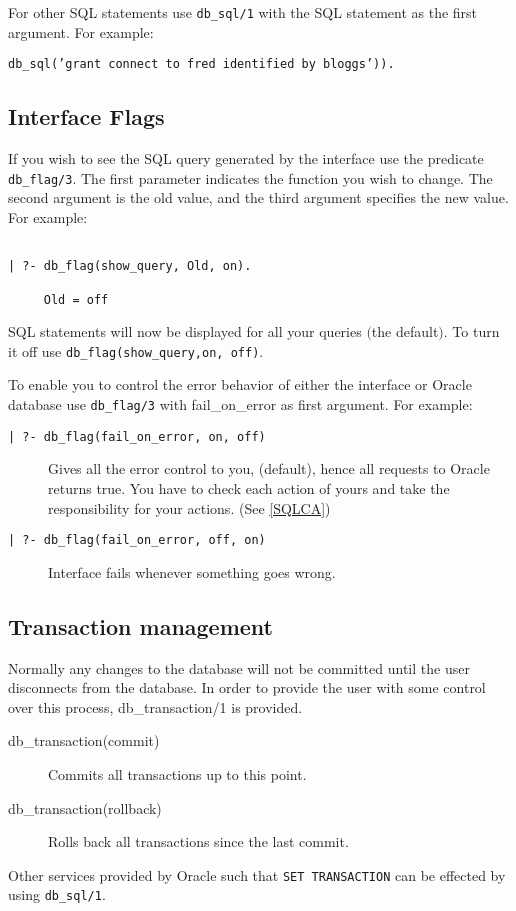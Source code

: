 For other SQL statements use {\tt db\_sql/1} with the SQL statement as the 
     first argument.  For example:
\begin{center}
{\tt db\_sql('grant connect to fred identified by bloggs')).}
\end{center}


\subsection{Interface Flags}
	
   If you wish to see the SQL query generated by the interface use the 
predicate {\tt db\_flag/3}.  The first parameter indicates the function you wish to
change.  The second argument is the old value, and the third argument specifies
the new value.  For example:
\begin{verbatim}

| ?- db_flag(show_query, Old, on).

     Old = off
\end{verbatim}

SQL statements will now be displayed for all your queries $($the default$)$.
To turn it off use {\tt db\_flag(show\_query,on, off)}.


To enable you to control the error behavior of either the interface or
Oracle database use {\tt db\_flag/3} with fail\_on\_error as first argument.
For example:

\begin{description}

\item[\tt | ?- db\_flag(fail\_on\_error, on, off)]

     Gives all the error control to you,
     (default), hence all requests to Oracle returns true.  You have to check
     each action of yours and take the responsibility for your actions.
     (See \ref{SQLCA})

\item[\tt | ?- db\_flag(fail\_on\_error, off, on)]

	Interface fails whenever something goes wrong.
\end{description}


\subsection{Transaction management}\label{Transaction-management}


Normally any changes to the database will not be committed until the user 
disconnects from the database.  In order to provide the user with some control
over this process, db\_transaction/1 is provided. 
\begin{description}
\item[db\_transaction(commit)]
	Commits all transactions up to this point.
\item[db\_transaction(rollback)]
	Rolls back all transactions since the last commit.
\end{description}
Other services provided by Oracle such that {\tt SET TRANSACTION} can be
effected by using {\tt db\_sql/1}.

